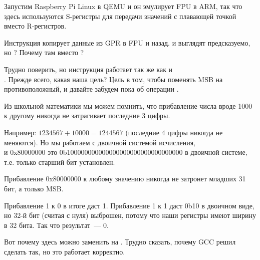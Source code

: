 

Запустим Raspberry Pi Linux в QEMU и он эмулирует FPU в ARM, так что здесь используются S-регистры
для передачи значений с плавающей точкой вместо R-регистров.

Инструкция \FMRS копирует данные из \ac{GPR} в FPU и назад.
 и  выглядят предсказуемо, но ?
Почему там \ADD вместо \XOR?

Трудно поверить, но инструкция 
 работает так же как и \\
.
Прежде всего, какая наша цель?
Цель в том, чтобы поменять \ac{MSB} на противоположный, и давайте забудем пока об операции \XOR.

Из школьной математики мы можем помнить, что прибавление числа вроде 1000 к другому никогда не затрагивает последние 3 цифры.

Например: $1234567 + 10000 = 1244567$ (последние 4 цифры никогда не меняются).
Но мы работаем с двоичной системой исчисления,\\
и 0x80000000 это 0b100000000000000000000000000000000
в двоичной системе, т.е. только старший бит установлен.

Прибавление 0x80000000 к любому значению никогда не затронет младших 31 бит, а только \ac{MSB}.

Прибавление 1 к 0 в итоге даст 1.
Прибавление 1 к 1 даст 0b10 в двоичном виде, но 32-й бит (считая с нуля) выброшен, 
потому что наши регистры имеют ширину в 32 бита. Так что результат~--- 0.

Вот почему \XOR здесь можно заменить на \ADD.
Трудно сказать, почему GCC решил сделать так, но это работает корректно.%

